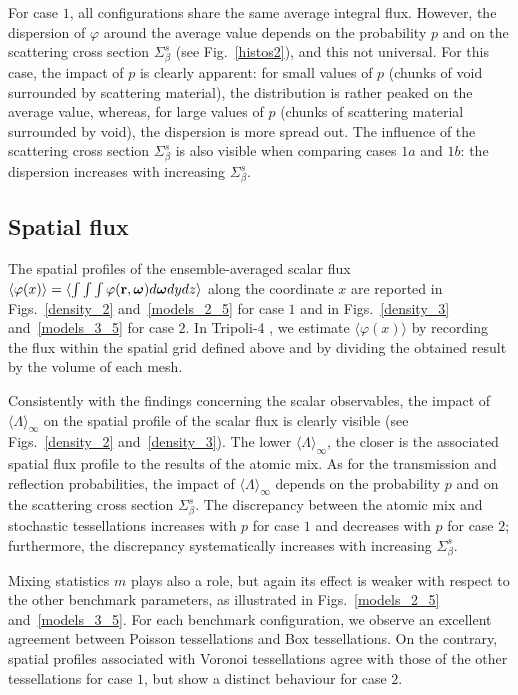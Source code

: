 \documentclass[final,authoryear,5p,times,twocolumn]{elsarticle}
\newcommand{\tripoli}{{\sc Tripoli-4}\textsuperscript{ \textregistered}}
\begin{document}
For case $1$, all configurations share the same average integral flux. However, the dispersion of $\varphi$ around the average value depends on the probability $p$ and on the scattering cross section $\Sigma_{\beta}^s$ (see Fig.~\ref{histos2}), and this not universal. For this case, the impact of $p$ is clearly apparent: for small values of $p$ (chunks of void surrounded by scattering material), the distribution is rather peaked on the average value, whereas, for large values of $p$ (chunks of scattering material surrounded by void), the dispersion is more spread out. The influence of the scattering cross section $\Sigma_{\beta}^s$ is also visible when comparing cases $1a$ and $1b$: the dispersion increases with increasing $\Sigma_{\beta}^s$. 

\subsection{Spatial flux}

The spatial profiles of the ensemble-averaged scalar flux $\langle \varphi(x) \rangle= \langle \int \int \int\varphi({\bf r}, {\boldsymbol \omega}) d {\boldsymbol \omega} dy dz \rangle$ along the coordinate $x$ are reported in Figs.~\ref{density_2} and~\ref{models_2_5} for case $1$ and in Figs.~\ref{density_3} and~\ref{models_3_5} for case $2$. In \tripoli{}, we estimate $\langle \varphi(x) \rangle$ by recording the flux within the spatial grid defined above and by dividing the obtained result by the volume of each mesh.

Consistently with the findings concerning the scalar observables, the impact of ${\langle \Lambda \rangle}_{\infty}$ on the spatial profile of the scalar flux is clearly visible (see Figs.~\ref{density_2} and~\ref{density_3}). The lower ${\langle \Lambda \rangle}_{\infty}$, the closer is the associated spatial flux profile to the results of the atomic mix. As for the transmission and reflection probabilities, the impact of ${\langle \Lambda \rangle}_{\infty}$ depends on the probability $p$ and on the scattering cross section $\Sigma_{\beta}^s$. The discrepancy between the atomic mix and stochastic tessellations increases with $p$ for case $1$ and decreases with $p$ for case $2$; furthermore, the discrepancy systematically increases with increasing $\Sigma_{\beta}^s$.

Mixing statistics $m$ plays also a role, but again its effect is weaker with respect to the other benchmark parameters, as illustrated in Figs.~\ref{models_2_5} and~\ref{models_3_5}. For each benchmark configuration, we observe an excellent agreement between Poisson tessellations and Box tessellations. On the contrary, spatial profiles associated with Voronoi tessellations agree with those of the other tessellations for case $1$, but show a distinct behaviour for case $2$.
\end{document}
